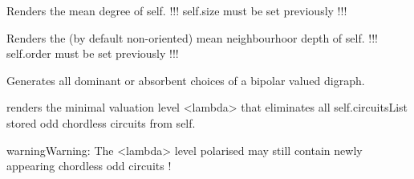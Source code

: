 \documentclass[letterpaper,10pt,english]{sphinxmanual}
\begin{document}
\begin{fulllineitems}
\begin{fulllineitems}
\end{fulllineitems}


\begin{fulllineitems}
\label{techDoc:digraphs.Digraph.meanDegree}
Renders the mean degree of self.
!!! self.size must be set previously !!!

\end{fulllineitems}


\begin{fulllineitems}
\label{techDoc:digraphs.Digraph.meanLength}
Renders the (by default non-oriented) mean neighbourhoor depth of self.
!!! self.order must be set previously !!!

\end{fulllineitems}


\begin{fulllineitems}
\label{techDoc:digraphs.Digraph.minimalChoices}
Generates all dominant or absorbent choices of a bipolar
valued digraph.

\end{fulllineitems}


\begin{fulllineitems}
\label{techDoc:digraphs.Digraph.minimalValuationLevelForCircuitsElimination}
renders the minimal valuation level \textless{}lambda\textgreater{} that eliminates all
self.circuitsList stored odd chordless circuits from self.

\begin{notice}{warning}{Warning:}
The \textless{}lambda\textgreater{} level polarised may still contain newly appearing chordless odd circuits !
\end{notice}

\end{fulllineitems}



\end{fulllineitems}
\end{document}
